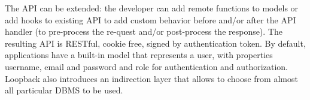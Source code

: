 The API can be extended: the developer can add remote functions to models or add hooks to existing API to add custom behavior before and/or after the API handler (to pre-process the re-quest and/or post-process the response). The resulting API is RESTful, cookie free, signed by authentication token. By default, applications have a built-in model that represents a user, with properties username, email and password and role for authentication and authorization. Loopback also introduces an indirection layer that allows to choose from almost all particular DBMS to be used.
